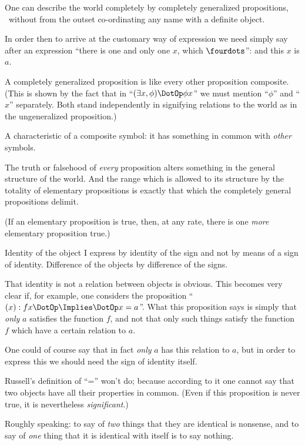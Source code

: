 {One can describe the world completely by
completely generalized propositions, \idEst\ without
from the outset co-ordinating any name with a
definite object.

In order then to arrive at the customary way
of expression we need simply say after an expression
``there is one and only one $x$, which $\fourdots$'':
and this $x$ is $a$.}


{A completely generalized proposition is like
every other proposition composite. (This is shown
by the fact that in ``$(\exists x, \phi) \DotOp \phi x$'' we must mention
``$\phi$'' and ``$x$'' separately. Both stand independently
in signifying relations to the world
as in the ungeneralized proposition.)

A characteristic of a composite symbol: it has
something in common with \emph{other} symbols.}


{The truth or falsehood of \emph{every} proposition alters
something in the general structure of the world.
And the range which is allowed to its structure by
the totality of elementary propositions is exactly
that which the completely general propositions
delimit.

(If an elementary proposition is true, then, at
any rate, there is one \emph{more} elementary proposition
true.)}


{Identity of the object I express by identity of
the sign and not by means of a sign of identity.
Difference of the objects by difference of the
signs.}


{That identity is not a relation between objects is
obvious. This becomes very clear if, for example,
one considers the proposition ``$(x) : fx \DotOp \Implies \DotOp x = a$''.
What this proposition says is simply that \emph{only}
$a$ satisfies the function $f$, and not that only such
things satisfy the function $f$ which have a certain
relation to $a$.

One could of course say that in fact \emph{only}
$a$ has this relation to $a$, but in order to express
this we should need the sign of identity itself.}


{Russell's definition of ``='' won't do; because
according to it one cannot say that two objects
have all their properties in common. (Even if
this proposition is never true, it is nevertheless
\emph{significant}.)}


{Roughly speaking: to say of \emph{two} things that
they are identical is nonsense, and to say of \emph{one}
thing that it is identical with itself is to say
nothing.}


